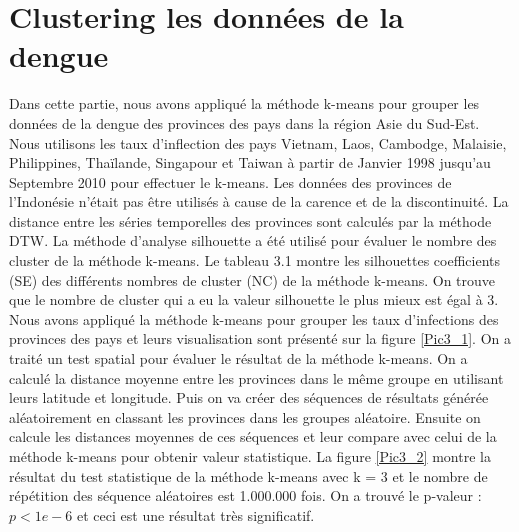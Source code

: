 \section{Clustering les données de la dengue}
Dans cette partie, nous avons appliqué la méthode k-means pour grouper les données de la dengue des provinces des pays dans la région Asie du Sud-Est. Nous utilisons les taux d'inflection des pays Vietnam, Laos, Cambodge, Malaisie, Philippines, Thaïlande, Singapour et Taiwan à partir de Janvier 1998 jusqu'au Septembre 2010 pour effectuer le k-means. Les données des provinces de l'Indonésie n'était  pas  être utilisés à cause de la carence et de la discontinuité. La distance entre les séries temporelles des provinces sont calculés par la méthode DTW. La méthode d'analyse silhouette a été utilisé pour évaluer le nombre des cluster de la méthode k-means. Le tableau 3.1 montre les silhouettes coefficients (SE) des différents nombres de cluster (NC) de la méthode k-means. On trouve que le nombre de cluster qui a eu la valeur silhouette le plus mieux est égal à 3. Nous avons appliqué la méthode k-means pour grouper les taux d'infections des provinces des pays et leurs visualisation sont présenté sur la figure \ref{Pic3_1}.  On a traité un test spatial pour évaluer le résultat de la méthode k-means. On a calculé la distance moyenne entre les provinces dans le même groupe en utilisant leurs latitude et longitude. Puis on va créer des séquences de résultats générée aléatoirement en classant les provinces dans les groupes aléatoire. Ensuite on calcule les distances moyennes de ces séquences et leur compare avec celui de la méthode k-means pour obtenir valeur statistique. La figure \ref{Pic3_2} montre la résultat du test statistique de la méthode k-means avec k = 3 et le nombre de répétition des séquence aléatoires est 1.000.000 fois. On a trouvé le p-valeur : $p < 1e-6$ et ceci est une résultat très significatif.

